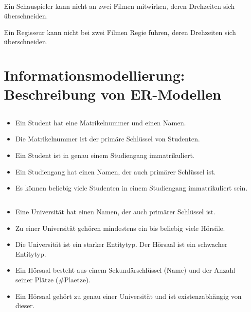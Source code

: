 \documentclass[ngerman]{gdb-aufgabenblatt}
\begin{document}
	\subsection{} %
	Ein Schauspieler kann nicht an zwei Filmen mitwirken, deren Drehzeiten sich überschneiden.
	
	Ein Regisseur kann nicht bei zwei Filmen Regie führen, deren Drehzeiten sich überschneiden.
\section{Informationsmodellierung: Beschreibung von ER-Modellen}
	\subsection{} %
		\begin{itemize}
			\item	Ein Student hat eine Matrikelnummer und einen Namen.
			\item	Die Matrikelnummer ist der primäre Schlüssel von Studenten.
			\item	Ein Student ist in genau einem Studiengang immatrikuliert.
			\item	Ein Studiengang hat einen Namen, der auch primärer Schlüssel ist.
			\item	Es können beliebig viele Studenten in einem Studiengang immatrikuliert sein.
		\end{itemize}
	\subsection{} %
		\begin{itemize}
			\item	Eine Universität hat einen Namen, der auch primärer Schlüssel ist.
			\item	Zu einer Universität gehören mindestens ein bis beliebig viele Hörsäle.
			\item	Die Universität ist ein starker Entitytyp. Der Hörsaal ist ein schwacher Entitytyp.
			\item	Ein Hörsaal besteht aus einem Sekundärschlüssel (Name) und der Anzahl seiner Plätze (\#Plaetze).
			\item	Ein Hörsaal gehört zu genau einer Universität und ist existenzabhängig von dieser.
		\end{itemize}
\end{document}

